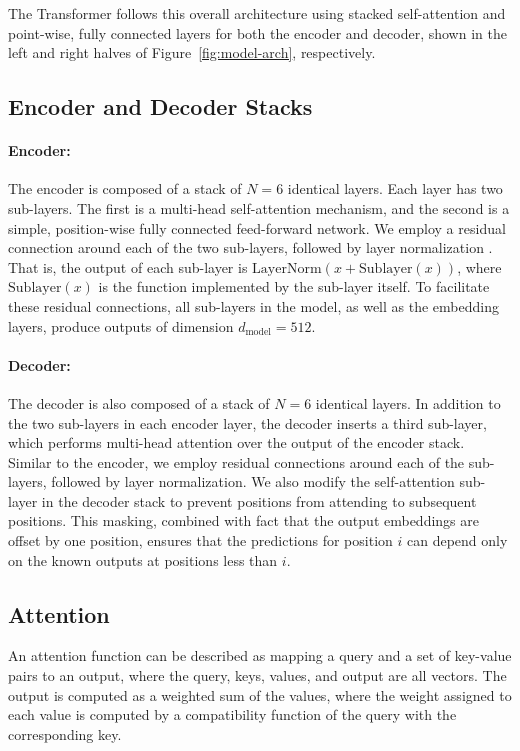 \documentclass{article}
\newcommand{\dmodel}{d_{\text{model}}}
\begin{document}
The Transformer follows this overall architecture using stacked self-attention and point-wise, fully connected layers for both the encoder and decoder, shown in the left and right halves of Figure~\ref{fig:model-arch}, respectively.

\subsection{Encoder and Decoder Stacks}

\paragraph{Encoder:}The encoder is composed of a stack of $N=6$ identical layers. Each layer has two sub-layers. The first is a multi-head self-attention mechanism, and the second is a simple, position-wise fully connected feed-forward network.   We employ a residual connection \citep{he2016deep} around each of the two sub-layers, followed by layer normalization \cite{layernorm2016}.  That is, the output of each sub-layer is $\mathrm{LayerNorm}(x + \mathrm{Sublayer}(x))$, where $\mathrm{Sublayer}(x)$ is the function implemented by the sub-layer itself.  To facilitate these residual connections, all sub-layers in the model, as well as the embedding layers, produce outputs of dimension $\dmodel=512$.

\paragraph{Decoder:}The decoder is also composed of a stack of $N=6$ identical layers.  In addition to the two sub-layers in each encoder layer, the decoder inserts a third sub-layer, which performs multi-head attention over the output of the encoder stack.  Similar to the encoder, we employ residual connections around each of the sub-layers, followed by layer normalization.  We also modify the self-attention sub-layer in the decoder stack to prevent positions from attending to subsequent positions.  This masking, combined with fact that the output embeddings are offset by one position, ensures that the predictions for position $i$ can depend only on the known outputs at positions less than $i$.



\subsection{Attention} \label{sec:attention}
An attention function can be described as mapping a query and a set of key-value pairs to an output, where the query, keys, values, and output are all vectors.  The output is computed as a weighted sum of the values, where the weight assigned to each value is computed by a compatibility function of the query with the corresponding key.
\end{document}
